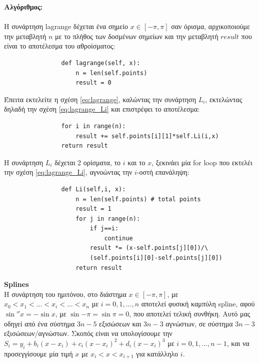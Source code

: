 \documentclass[a4paper,11pt]{article}
\newcommand{\lt}{\latintext}
\newcommand{\gt}{\greektext}
\begin{document}
{\begin{description}
\textbf{Αλγόριθμος:}\\\\
Η συνάρτηση {\lt lagrange} δέχεται ένα σημείο $x\in[-\pi,\pi]$ σαν όρισμα, αρχικοποιούμε την μεταβλητή $n$ με το πλήθος των δοσμένων σημείων και την μεταβλητή $result$ που είναι το αποτέλεσμα του αθροίσματος:
    \lt
    \begin{verbatim}
                def lagrange(self, x):
                    n = len(self.points)
                    result = 0
    \end{verbatim}
    \gt
    Έπειτα εκτελείτε η σχέση \eqref{eq:lagrange}, καλώντας την συνάρτηση $L_i$, εκτελώντας δηλαδή την σχέση \eqref{eq:lagrange_Li} και επιστρέφει το αποτέλεσμα:
    \lt
    \begin{verbatim}
                for i in range(n):
                    result += self.points[i][1]*self.Li(i,x)
                return result
    \end{verbatim}
    \gt
    Η συνάρτηση $L_i$ δέχεται 2 ορίσματα, το $i$ και το $x$, ξεκινάει μία {\lt for loop} που εκτελέι την σχέση \eqref{eq:lagrange_Li}, αγνοώντας την $i$-οστή επανάληψη:
    \lt
    \begin{verbatim}
                def Li(self,i, x):
                    n = len(self.points) # total points
                    result = 1
                    for j in range(n):
                        if j==i:
                            continue
                        result *= (x-self.points[j][0])/\
                        (self.points[i][0]-self.points[j][0])
                    return result
    \end{verbatim}
    \gt
    \newpage
\item[β)]{\textbf{\lt Splines}}\\
Η συνάρτηση του ημιτόνου, στο διάστημα $x\in[-\pi,\pi]$, με $x_0<x_1<…<x_i<...<x_n$ με $i=0,1,...,n$ αποτελεί φυσική καμπύλη {\lt spline}, αφού $\sin''{x} = -\sin{x}$, με $\sin{-\pi} = \sin{\pi} = 0$, που αποτελεί τελική συνθήκη. Αυτό μας οδηγεί από ένα σύστημα $3n-5$ εξισώσεων και $3n-3$ αγνώστων, σε σύστημα $3n-3$ εξισώσεων/αγνώστων. Σκοπός είναι να υπολογίσουμε την $S_i = y_{i} + b_i(x-x_i) + c_i(x-x_i)^2 + d_i(x-x_i)^3$ με $i=0,1,...,n-1$, και να προσεγγίσουμε μία τιμή $x$ με $x_i<x<x_{i+1}$ για κατάλληλο $i$.


\end{description}}
\end{document}
